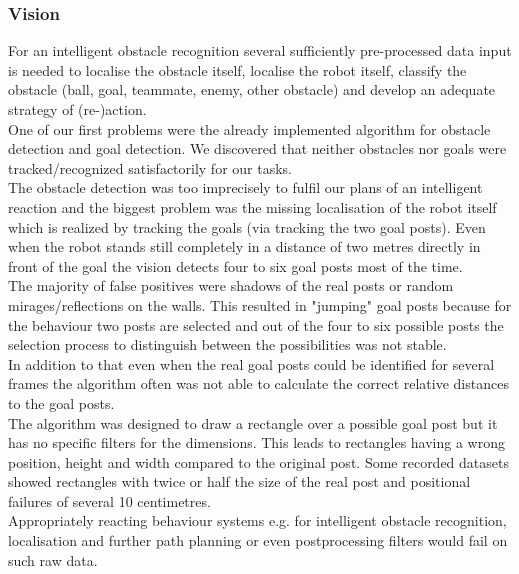 \documentclass[lnicst,a4paper]{svmultln}
\begin{document}
\subsubsection{Vision}
For an intelligent obstacle recognition several sufficiently pre-processed data input is needed to localise the obstacle itself, localise the robot itself, classify the obstacle (ball, goal, teammate, enemy, other obstacle) and develop an adequate strategy of (re-)action.
\\
One of our first problems were the already implemented algorithm for obstacle detection and goal detection. We discovered that neither obstacles nor goals were tracked/recognized satisfactorily for our tasks.
\\
The obstacle detection was too imprecisely to fulfil our plans of an intelligent reaction and the biggest problem was the missing localisation of the robot itself which is realized by tracking the goals (via tracking the two goal posts). Even when the robot stands still completely in a distance of two metres directly in front of the goal the vision detects four to six goal posts most of the time.
\\
The majority of false positives were shadows of the real posts or random mirages/reflections on the walls. This resulted in "jumping" goal posts because for the behaviour two posts are selected and out of the four to six possible posts the selection process to distinguish between the possibilities was not stable.
\\
In addition to that even when the real goal posts could be identified for several frames the algorithm often was not able to calculate the correct relative distances to the goal posts.
\\
The algorithm was designed to draw a rectangle over a possible goal post but it has no specific filters for the dimensions. This leads to rectangles having a wrong position, height and width compared to the original post. Some recorded datasets showed rectangles with twice or half the size of the real post and positional failures of several 10 centimetres.
\\
Appropriately reacting behaviour systems e.g. for intelligent obstacle recognition, localisation and further path planning or even postprocessing filters would fail on such raw data.
\end{document}
